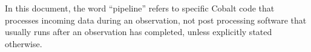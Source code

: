 \documentclass[a4paper,twoside, 10pt]{report}
\newcommand{\cobalt}{Cobalt\xspace}
\newcommand{\hms}[3]{\ensuremath{#1^\mathrm{h} #2^\mathrm{m} #3^\mathrm{s}}}
\newcommand{\dms}[3]{\ensuremath{#1^\circ #2' #3''}}
\begin{document}
In this document, the word ``pipeline'' refers to specific \cobalt
code that processes incoming data during an observation, not post
processing software that usually runs after an observation has
completed, unless explicitly stated otherwise.







\end{document}
